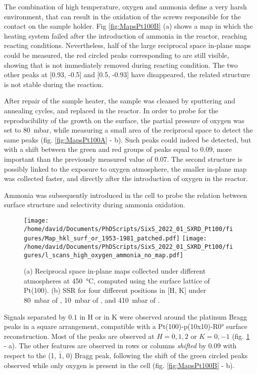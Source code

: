 The combination of high temperature, oxygen and ammonia define a very harsh environment, that can result in the oxidation of the screws responsible for the contact on the sample holder.
Fig \ref{fig:MapsPt100B} (a) shows a map in which the heating system failed after the introduction of ammonia in the reactor, reaching reacting conditions.
Nevertheless, half of the large reciprocal space in-plane maps could be measured, the red circled peaks corresponding to  are still visible, showing that  is not immediately removed during reacting condition.
The two other peaks at [0.93, -0.5] and [0.5, -0.93] have disappeared, the related structure is not stable during the reaction.

After repair of the sample heater, the sample was cleaned by sputtering and annealing cycles, and replaced in the reactor.
In order to probe for the reproducibility of the  growth on the surface, the partial pressure of oxygen was set to \qty{80}{\milli\bar}, while measuring a small area of the reciprocal space to detect the same peaks (fig. \ref{fig:MapsPt100A} - b).
Such peaks could indeed be detected, but with a shift between the green and red groups of peaks equal to $0.09$, more important than the previously measured value of $0.07$.
The second structure is possibly linked to the exposure to oxygen atmosphere, the smaller in-plane map was collected faster, and directly after the introduction of oxygen in the reactor.

Ammonia was subsequently introduced in the cell to probe the relation between surface structure and selectivity during ammonia oxidation.

\begin{figure}[!htb]
    \centering
    \texttt{[image: /home/david/Documents/PhDScripts/SixS\_2022\_01\_SXRD\_Pt100/figures/Map\_hkl\_surf\_or\_1953-1981\_patched.pdf]}
    \texttt{[image: /home/david/Documents/PhDScripts/SixS\_2022\_01\_SXRD\_Pt100/figures/l\_scans\_high\_oxygen\_ammonia\_no\_map.pdf]}
    \caption{
        (a) Reciprocal space in-plane maps collected under different atmospheres at \qty{450}{\degreeCelsius}, computed using the surface lattice of Pt(100).
        (b) SSR for four different positions in [H, K] under \qty{80}{\milli\bar} of , \qty{10}{\milli\bar} of , and \qty{410}{\milli\bar} of .
    }
    \label{fig:MapsAndLScansPt100HighOxAmmonia}
\end{figure}

Signals separated by $0.1$ in H or in K were observed around the platinum Bragg peaks in a square arrangement, compatible with a Pt(100)-p(10x10)-R\ang{0} surface reconstruction.
Most of the peaks are observed at $H={0,1,2}$ or $K={0, -1}$ (fig. \ref{fig:MapsAndLScansPt100HighOxAmmonia} - a).
The other features are observed in rows or columns \textit{shifted} by $0.09$ with respect to the (1, $\bar{1}$, 0) Bragg peak, following the shift of the green circled peaks observed while only oxygen is present in the cell (fig. \ref{fig:MapsPt100B} - b).

